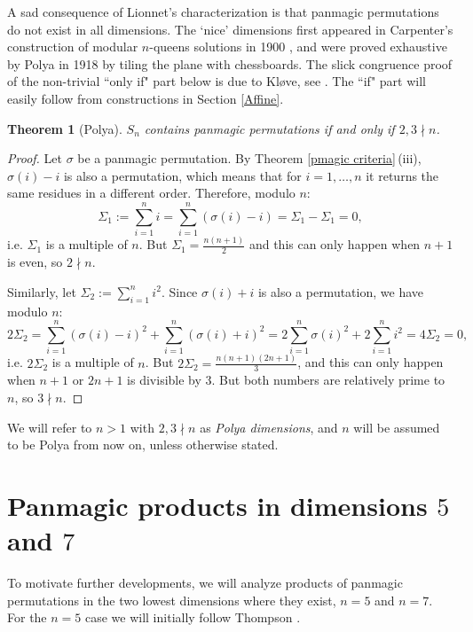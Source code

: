 \documentclass[11pt]{article}
\theoremstyle{plain}
\newtheorem{theorem}{Theorem}
\theoremstyle{definition}
\newcommand{\+}[1]{{#1}^\times}
\def\s{{\sigma}}
\begin{document}
A sad consequence of Lionnet's characterization is that panmagic permutations do not exist in all dimensions. The `nice' dimensions first appeared in Carpenter's construction of modular $n$-queens solutions in 1900 \cite{Carp}, and were proved exhaustive by Polya in 1918 by tiling the plane with chessboards. The slick congruence proof of the non-trivial ``only if" part below is due to Kl\o ve, see \cite{BS1}. The ``if" part will easily follow from constructions in Section \ref{Affine}.
\begin{theorem}[Polya]\label{PolyaDim} $S_n$ contains panmagic permutations if and only if $2,3\nmid n$. 
\end{theorem}
\begin{proof} Let $\s$ be a panmagic permutation. By Theorem \ref{pmagic criteria}\,(iii), $\s(i)-i$ is also a permutation, which means that for $i=1,\dots,n$ it returns the same residues in a different order. Therefore, modulo $n$: 
$$
\Sigma_1:=\sum_{i=1}^ni=\sum_{i=1}^n(\s(i)-i)=\Sigma_1-\Sigma_1=0,
$$ 
i.e. $\Sigma_1$ is a multiple of $n$. But $\Sigma_1=\frac{n(n+1)}{2}$ and this can only happen when $n+1$ is even, so $2\nmid n$. 

Similarly, let $\Sigma_2:=\sum_{i=1}^ni^2$. Since $\s(i)+i$ is also a permutation, we have modulo $n$: 
$$
2\Sigma_2=\sum_{i=1}^n(\s(i)-i)^2+\sum_{i=1}^n(\s(i)+i)^2= 2\sum_{i=1}^n\s(i)^2+2\sum_{i=1}^ni^2=4\Sigma_2=0,
$$ 
i.e. $2\Sigma_2$ is a multiple of $n$. But $2\Sigma_2=\frac{n(n+1)(2n+1)}{3}$, and this can only happen when $n+1$ or $2n+1$ is divisible by $3$. But both numbers are relatively prime to $n$, so $3\nmid n$. 
\end{proof}
\noindent We will refer to $n>1$ with $2,3\nmid n$ as {\it Polya dimensions}, and $n$ will be assumed to be Polya from now on, unless otherwise stated.

\section{Panmagic products in dimensions $5$ and $7$} \label{57PMag}

To motivate further developments, we will analyze products of panmagic permutations in the two lowest dimensions where they exist, $n=5$ and $n=7$. For the $n=5$ case we will initially follow Thompson \cite{Thom}.
\end{document}
